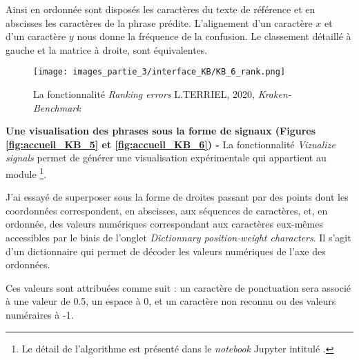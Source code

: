 Ainsi en ordonnée sont disposés les caractères du texte de référence et en abscisses les caractères de la phrase prédite. L'alignement d'un caractère $x$ et d'un caractère $y$ nous donne la fréquence de la confusion. Le classement détaillé à gauche et la matrice à droite, sont équivalentes. 
\newpage
\begin{figure}[h!]
    \centering
    \texttt{[image: images\_partie\_3/interface\_KB/KB\_6\_rank.png]}
        \caption{La fonctionnalité \textit{Ranking errors} \textcopyright L.TERRIEL, 2020, \textit{Kraken-Benchmark}}
        \label{fig:accueil_KB_4}
\end{figure}
\bigskip

\textbf{Une visualisation des phrases sous la forme de signaux (Figures \ref{fig:accueil_KB_5} et \ref{fig:accueil_KB_6}) - } La fonctionnalité \textit{Vizualize signals} permet de générer une visualisation expérimentale qui appartient au module \footnote{Le détail de l'algorithme est présenté dans le \textit{notebook} Jupyter intitulé .}. 

J'ai essayé de superposer sous la forme de droites passant par des points dont les coordonnées correspondent, en abscisses, aux séquences de caractères, et, en ordonnée, des valeurs numériques correspondant aux caractères eux-mêmes accessibles par le biais de l'onglet \textit{Dictionnary position-weight characters}. Il s'agit d'un dictionnaire qui permet de décoder les valeurs numériques de l'axe des ordonnées. 

Ces valeurs sont attribuées comme suit : un caractère de ponctuation sera associé à une valeur de 0.5, un espace à 0, et un caractère non reconnu ou des valeurs numéraires à -1.

